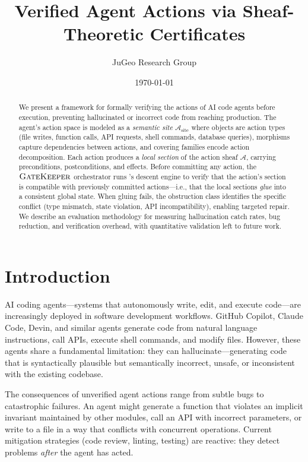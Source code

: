 \documentclass[11pt]{article}
\title{\textbf{Verified Agent Actions via Sheaf-Theoretic Certificates}}
\author{JuGeo Research Group}
\date{\today}
\newcommand{\ActionSite}{\mathcal{A}_{\mathrm{site}}}
\newcommand{\ActionSheaf}{\mathscr{A}}
\newcommand{\GateKeeper}{\textsc{GateKeeper}}
\begin{document}
\maketitle

\begin{abstract}
We present a framework for formally verifying the actions of AI code
agents before execution, preventing hallucinated or incorrect code from
reaching production.  The agent's action space is modeled as a
\emph{semantic site} $\ActionSite$ where objects are action types (file
writes, function calls, API requests, shell commands, database queries),
morphisms capture dependencies between actions, and covering families
encode action decomposition.  Each action produces a \emph{local section}
of the action sheaf $\ActionSheaf$, carrying preconditions, postconditions,
and effects.  Before committing any action, the $\GateKeeper$ orchestrator
runs \JuGeo's descent engine to verify that the action's section is
compatible with previously committed actions---i.e., that the local
sections \emph{glue} into a consistent global state.  When gluing fails,
the obstruction class identifies the specific conflict (type mismatch,
state violation, API incompatibility), enabling targeted repair.
We describe an evaluation methodology for measuring hallucination catch
rates, bug reduction, and verification overhead, with quantitative
validation left to future work.
\end{abstract}

\newpage

\section{Introduction}\label{sec:intro}

AI coding agents---systems that autonomously write, edit, and execute
code---are increasingly deployed in software development workflows.
GitHub Copilot, Claude Code, Devin, and similar agents generate code
from natural language instructions, call APIs, execute shell commands,
and modify files.  However, these agents share a fundamental
limitation: they can hallucinate---generating code that is
syntactically plausible but semantically incorrect, unsafe, or
inconsistent with the existing codebase.

The consequences of unverified agent actions range from subtle bugs
to catastrophic failures.  An agent might generate a function that
violates an implicit invariant maintained by other modules, call an
API with incorrect parameters, or write to a file in a way that
conflicts with concurrent operations.  Current mitigation strategies
(code review, linting, testing) are reactive: they detect problems
\emph{after} the agent has acted.
\end{document}
